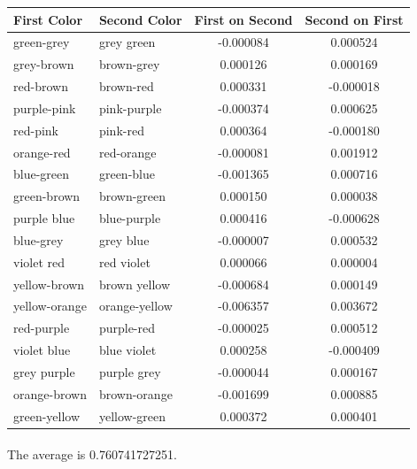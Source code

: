\documentclass[12pt, letterpaper]{article}
\begin{document}
\begin{center}
\begin{tabular}{| l | l | c | c |} \hline
First Color & Second Color & First on Second & Second on First \\ \hline
green-grey & grey green & -0.000084 & 0.000524 \\ \hline
grey-brown & brown-grey & 0.000126 & 0.000169 \\ \hline
red-brown & brown-red & 0.000331 & -0.000018 \\ \hline
purple-pink & pink-purple & -0.000374 & 0.000625 \\ \hline
red-pink & pink-red & 0.000364 & -0.000180 \\ \hline
orange-red & red-orange & -0.000081 & 0.001912 \\ \hline
blue-green & green-blue & -0.001365 & 0.000716 \\ \hline
green-brown & brown-green & 0.000150 & 0.000038 \\ \hline
purple blue & blue-purple & 0.000416 & -0.000628 \\ \hline
blue-grey & grey blue & -0.000007 & 0.000532 \\ \hline
violet red & red violet & 0.000066 & 0.000004 \\ \hline
yellow-brown & brown yellow & -0.000684 & 0.000149 \\ \hline
yellow-orange & orange-yellow & -0.006357 & 0.003672 \\ \hline
red-purple & purple-red & -0.000025 & 0.000512 \\ \hline
violet blue & blue violet & 0.000258 & -0.000409 \\ \hline
grey purple & purple grey & -0.000044 & 0.000167 \\ \hline
orange-brown & brown-orange & -0.001699 & 0.000885 \\ \hline
green-yellow & yellow-green & 0.000372 & 0.000401 \\ \hline
\end{tabular}

\end{center}
\paragraph{} The average is 0.760741727251.
\end{document}
